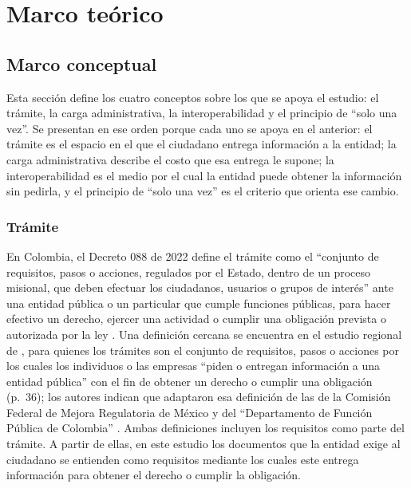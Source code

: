
\section{Marco teórico}

\subsection{Marco conceptual}

Esta sección define los cuatro conceptos sobre los que se apoya el estudio: el trámite, la carga administrativa, la interoperabilidad y el principio de \enquote{solo una vez}. Se presentan en ese orden porque cada uno se apoya en el anterior: el trámite es el espacio en el que el ciudadano entrega información a la entidad; la carga administrativa describe el costo que esa entrega le supone; la interoperabilidad es el medio por el cual la entidad puede obtener la información sin pedirla, y el principio de \enquote{solo una vez} es el criterio que orienta ese cambio.

\subsubsection{Trámite}

En Colombia, el Decreto 088 de 2022 define el trámite como el \enquote{conjunto de requisitos, pasos o acciones, regulados por el Estado, dentro de un proceso misional, que deben efectuar los ciudadanos, usuarios o grupos de interés} ante una entidad pública o un particular que cumple funciones públicas, para hacer efectivo un derecho, ejercer una actividad o cumplir una obligación prevista o autorizada por la ley \parencite[art.~2.2.20.3, num.~13]{colombia2022decreto088}. Una definición cercana se encuentra en el estudio regional de \textcite{roseth2018complicada}, para quienes los trámites son el conjunto de requisitos, pasos o acciones por los cuales los individuos o las empresas \enquote{piden o entregan información a una entidad pública} con el fin de obtener un derecho o cumplir una obligación (p.~36); los autores indican que adaptaron esa definición de las de la Comisión Federal de Mejora Regulatoria de México y del \enquote{Departamento de Función Pública de Colombia} \parencite[p.~36, nota~1]{roseth2018complicada}. Ambas definiciones incluyen los requisitos como parte del trámite. A partir de ellas, en este estudio los documentos que la entidad exige al ciudadano se entienden como requisitos mediante los cuales este entrega información para obtener el derecho o cumplir la obligación.

